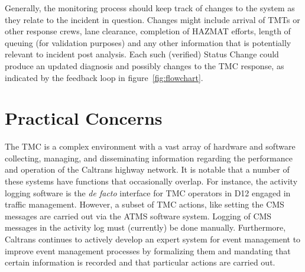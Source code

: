 \documentclass[12pt]{report}
\begin{document}
Generally, the monitoring process should keep track of changes to the system as
they relate to the incident in question.  Changes might include arrival of
\ac{TMT}s or other response crews, lane clearance, completion of \ac{HAZMAT}
efforts, length of queuing (for validation purposes) and any other information
that is potentially relevant to incident post analysis.  Each such (verified)
{\sc Status Change} could produce an updated diagnosis and possibly changes to
the \ac{TMC} response, as indicated by the feedback loop in
figure~\ref{fig:flowchart}.


\section{Practical Concerns}
\label{sec:practical-concerns}

The \ac{TMC} is a complex environment with a vast array of hardware and software
collecting, managing, and disseminating information regarding the performance
and operation of the Caltrans highway network.  It is notable that a number of
these systems have functions that occasionally overlap.  For instance, the
activity logging software is the \emph{de facto} interface for \ac{TMC}
operators in \ac{D12} engaged in traffic management.  However, a subset of
\ac{TMC} actions, like setting the \ac{CMS} messages are carried out via the
\ac{ATMS} software system.  Logging of \ac{CMS} messages in the activity log
must (currently) be done manually.  Furthermore, Caltrans continues to actively
develop an expert system for event management to improve event management
processes by formalizing them and mandating that certain information is recorded
and that particular actions are carried out.
\end{document}
